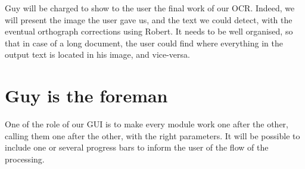 Guy will be charged to show to the user the final work of our OCR. Indeed, we will present the image the user gave us, and the text we could detect, with the eventual orthograph corrections using Robert. It needs to be well organised, so that in case of a long document, the user could find where everything in the output text is located in his image, and vice-versa.

\section{Guy is the foreman}

One of the role of our GUI is to make every module work one after the other, calling them one after the other, with the right parameters. It will be possible to include one or several progress bars to inform the user of the flow of the processing.

